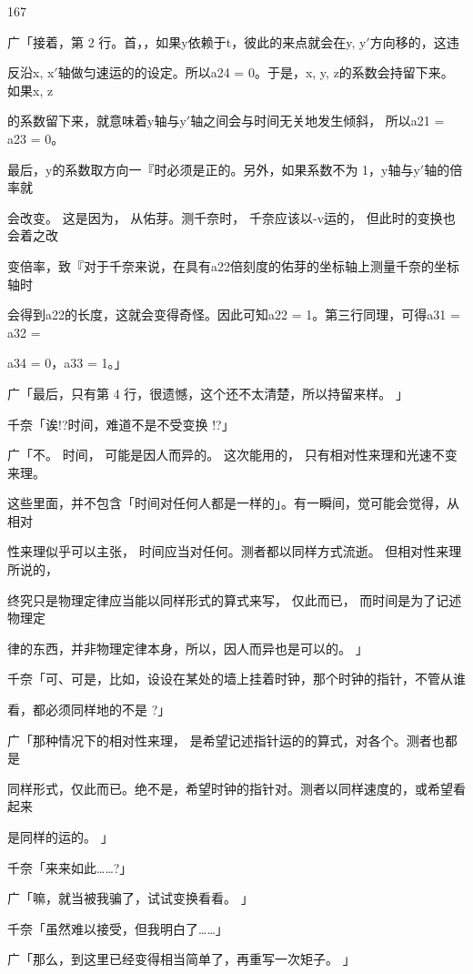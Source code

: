 167\par
广「接着，第 2 行。首，，如果y依赖于t，彼此的来点就会在y, y$\prime$方向移的，这违\par
反沿x, x$\prime$轴做匀速运的的设定。所以a24 = 0。于是，x, y, z的系数会持留下来。如果x, z\par
的系数留下来，就意味着y轴与y$\prime$轴之间会与时间无关地发生倾斜， 所以a21 = a23 = 0。\par
最后，y的系数取方向一『时必须是正的。另外，如果系数不为 1，y轴与y$\prime$轴的倍率就\par
会改变。 这是因为， 从佑芽。测千奈时， 千奈应该以-v运的， 但此时的变换也会着之改\par
变倍率，致『对于千奈来说，在具有a22倍刻度的佑芽的坐标轴上测量千奈的坐标轴时\par
会得到a22的长度，这就会变得奇怪。因此可知a22 = 1。第三行同理，可得a31 = a32 =\par
a34 = 0，a33 = 1。」\par
广「最后，只有第 4 行，很遗憾，这个还不太清楚，所以持留来样。 」\par
千奈「诶!?时间，难道不是不受变换 !?」\par
广「不。 时间， 可能是因人而异的。 这次能用的， 只有相对性来理和光速不变来理。\par
这些里面，并不包含「时间对任何人都是一样的」。有一瞬间，觉可能会觉得，从相对\par
性来理似乎可以主张， 时间应当对任何。测者都以同样方式流逝。 但相对性来理所说的，\par
终究只是物理定律应当能以同样形式的算式来写， 仅此而已， 而时间是为了记述物理定\par
律的东西，并非物理定律本身，所以，因人而异也是可以的。 」\par
千奈「可、可是，比如，设设在某处的墙上挂着时钟，那个时钟的指针，不管从谁\par
看，都必须同样地的不是 ?」\par
广「那种情况下的相对性来理， 是希望记述指针运的的算式，对各个。测者也都是\par
同样形式，仅此而已。绝不是，希望时钟的指针对。测者以同样速度的，或希望看起来\par
是同样的运的。 」\par
千奈「来来如此……?」\par
广「嘛，就当被我骗了，试试变换看看。 」\par
千奈「虽然难以接受，但我明白了……」\par
广「那么，到这里已经变得相当简单了，再重写一次矩子。 」\par
